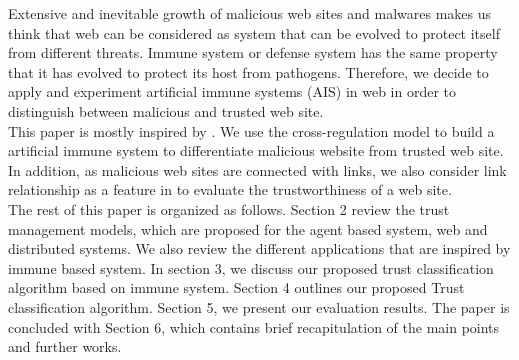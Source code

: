 \documentclass{llncs}
\begin{document}
Extensive and inevitable growth of malicious web sites and malwares makes us think that web can be considered as system that can be evolved to protect itself from different threats.  Immune system or defense system has the same property that it has evolved to protect its host from pathogens. 
Therefore, we decide to apply and experiment artificial immune systems (AIS) \cite{AIS} in web in order to distinguish between malicious and trusted web site.\\ 
This paper is mostly inspired by \cite{Al1}. We use the cross-regulation model\cite{carneiro} to build a artificial immune system to differentiate malicious website from trusted web site. In addition, as malicious web sites are connected with links, we also consider link relationship as a feature in to evaluate the trustworthiness of a web site. \\
The rest of this paper is organized as follows. Section 2 review the trust management models, which are proposed for the agent based system, web and distributed systems.  We also review the different applications that are inspired by immune based system. In section 3, we discuss our proposed trust classification algorithm based on immune system.  Section 4 outlines our proposed Trust classification algorithm. Section 5, we present our evaluation results. The paper is concluded with Section 6, which contains brief recapitulation of the main points and further works.
\end{document}
